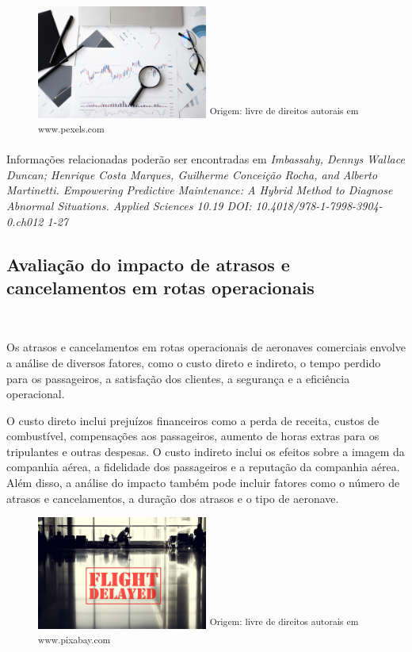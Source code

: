 \documentclass{article}
\begin{document}
\begin{figure}[h]
	\centering
	\includegraphics[width=0.5\textwidth]{Images/analise_dados.jpg}
	\small\textsuperscript{Origem: livre de direitos autorais em www.pexels.com}
\end{figure}

Informações relacionadas poderão ser encontradas em {\it Imbassahy, Dennys Wallace Duncan; Henrique Costa Marques, Guilherme Conceição Rocha, and Alberto Martinetti. Empowering Predictive Maintenance: A Hybrid Method to Diagnose Abnormal Situations. Applied Sciences 10.19 DOI: 10.4018/978-1-7998-3904-0.ch012 1-27}

\subsection{Avaliação do impacto de atrasos e cancelamentos em rotas operacionais}\

Os atrasos e cancelamentos em rotas operacionais de aeronaves comerciais envolve a análise de diversos fatores, como o custo direto e indireto, o tempo perdido para os passageiros, a satisfação dos clientes, a segurança e a eficiência operacional.

O custo direto inclui prejuízos financeiros como a perda de receita, custos de combustível, compensações aos passageiros, aumento de horas extras para os tripulantes e outras despesas. O custo indireto inclui os efeitos sobre a imagem da companhia aérea, a fidelidade dos passageiros e a reputação da companhia aérea. Além disso, a análise do impacto também pode incluir fatores como o número de atrasos e cancelamentos, a duração dos atrasos e o tipo de aeronave.

\begin{figure}[h]
	\centering
	\includegraphics[width=0.5\textwidth]{Images/flight_delay.jpg}
	\small\textsuperscript{Origem: livre de direitos autorais em www.pixabay.com}
\end{figure}
\end{document}
